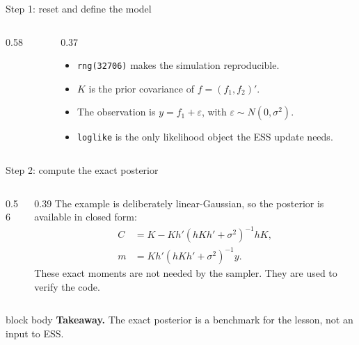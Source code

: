 \documentclass[aspectratio=169,11pt]{beamer}
\newcommand{\takeaway}[1]{%
  \vspace{0.3em}
  \begin{beamercolorbox}[rounded=true,sep=0.7em,wd=\linewidth]{block body}
    \textbf{Takeaway.} #1
  \end{beamercolorbox}
}
\begin{document}
\begin{frame}[fragile]{Step 1: reset and define the model}
  \begin{columns}[T,totalwidth=\textwidth]
    \begin{column}{0.58\textwidth}
      
    \end{column}
    \begin{column}{0.37\textwidth}
      \begin{itemize}
        \setlength{\itemsep}{0.7em}
        \item \texttt{rng(32706)} makes the simulation reproducible.
        \item \(K\) is the prior covariance of \(f=(f_1,f_2)'\).
        \item The observation is \(y=f_1+\varepsilon\), with \(\varepsilon\sim N(0,\sigma^2)\).
        \item \texttt{loglike} is the only likelihood object the ESS update needs.
      \end{itemize}
    \end{column}
  \end{columns}
\end{frame}

\begin{frame}[fragile]{Step 2: compute the exact posterior}
  \begin{columns}[T,totalwidth=\textwidth]
    \begin{column}{0.56\textwidth}
      
    \end{column}
    \begin{column}{0.39\textwidth}
      The example is deliberately linear-Gaussian, so the posterior is available in closed form:
      \[
        \begin{aligned}
          C &= K - K h'(hKh' + \sigma^2)^{-1}hK,\\
          m &= K h'(hKh' + \sigma^2)^{-1}y.
        \end{aligned}
      \]
      These exact moments are not needed by the sampler. They are used to verify the code.
    \end{column}
  \end{columns}
  \takeaway{The exact posterior is a benchmark for the lesson, not an input to ESS.}
\end{frame}
\end{document}
